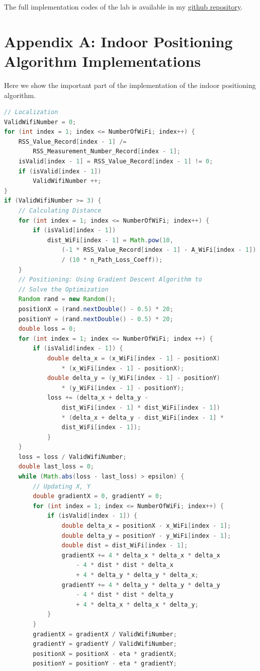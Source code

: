 \documentclass[12pt, a4paper]{article}
\theoremstyle{definition}
\begin{document}
The full implementation codes of the lab is available in my \href{https://github.com/Galaxies99/EE447-CourseData/tree/main/Labs/Lab1}{github repository}.

\section*{Appendix A: Indoor Positioning Algorithm Implementations}
Here we show the important part of the implementation of the indoor positioning algorithm.
\begin{lstlisting}[language=java]
// Localization
ValidWifiNumber = 0;
for (int index = 1; index <= NumberOfWiFi; index++) {
    RSS_Value_Record[index - 1] /=
        RSS_Measurement_Number_Record[index - 1];
    isValid[index - 1] = RSS_Value_Record[index - 1] != 0;
    if (isValid[index - 1])
        ValidWifiNumber ++;
}
if (ValidWifiNumber >= 3) {
    // Calculating Distance
    for (int index = 1; index <= NumberOfWiFi; index++) {
        if (isValid[index - 1])
            dist_WiFi[index - 1] = Math.pow(10, 
                (-1 * RSS_Value_Record[index - 1] - A_WiFi[index - 1]) 
                / (10 * n_Path_Loss_Coeff));
    }
    // Positioning: Using Gradient Descent Algorithm to
    // Solve the Optimization
    Random rand = new Random();
    positionX = (rand.nextDouble() - 0.5) * 20;
    positionY = (rand.nextDouble() - 0.5) * 20;
    double loss = 0;
    for (int index = 1; index <= NumberOfWiFi; index ++) {
        if (isValid[index - 1]) {
            double delta_x = (x_WiFi[index - 1] - positionX)
                * (x_WiFi[index - 1] - positionX);
            double delta_y = (y_WiFi[index - 1] - positionY) 
			    * (y_WiFi[index - 1] - positionY);
            loss += (delta_x + delta_y - 
                dist_WiFi[index - 1] * dist_WiFi[index - 1]) 
                * (delta_x + delta_y - dist_WiFi[index - 1] * 
                dist_WiFi[index - 1]);
            }
    }
    loss = loss / ValidWifiNumber;
    double last_loss = 0;
    while (Math.abs(loss - last_loss) > epsilon) {
        // Updating X, Y
        double gradientX = 0, gradientY = 0;
        for (int index = 1; index <= NumberOfWiFi; index++) {
            if (isValid[index - 1]) {
                double delta_x = positionX - x_WiFi[index - 1];
                double delta_y = positionY - y_WiFi[index - 1];
                double dist = dist_WiFi[index - 1];
                gradientX += 4 * delta_x * delta_x * delta_x
                    - 4 * dist * dist * delta_x
                    + 4 * delta_y * delta_y * delta_x;
                gradientY += 4 * delta_y * delta_y * delta_y 
                    - 4 * dist * dist * delta_y 
                    + 4 * delta_x * delta_x * delta_y;
            }
        }
        gradientX = gradientX / ValidWifiNumber;
        gradientY = gradientY / ValidWifiNumber;
        positionX = positionX - eta * gradientX;
        positionY = positionY - eta * gradientY;


\end{lstlisting}
\end{document}
